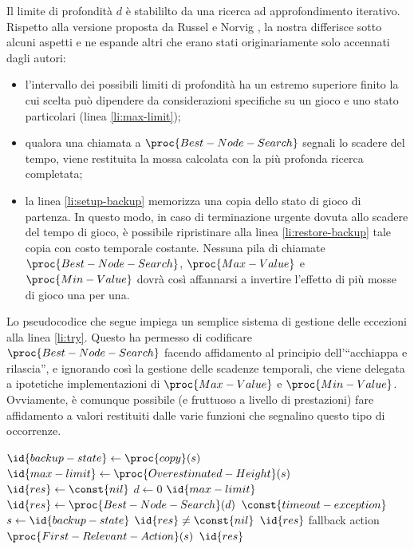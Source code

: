 \documentclass{article}
\begin{document}
Il limite di profondità $d$ è stabililto da una ricerca ad approfondimento
iterativo. Rispetto alla versione proposta da Russel e Norvig
\cite{at.UBO029034619980101.109--111}, la nostra differisce sotto alcuni aspetti
e ne espande altri che erano stati originariamente solo accennati dagli autori:
\begin{itemize}
    \item l'intervallo dei possibili limiti di profondità ha un estremo
      superiore finito la cui scelta può dipendere da considerazioni specifiche
      su un gioco e uno stato particolari (linea \ref{li:max-limit});
    \item qualora una chiamata a $\proc{Best-Node-Search}$ segnali lo scadere
      del tempo, viene restituita la mossa calcolata con la più profonda ricerca
      completata;
    \item la linea \ref{li:setup-backup} memorizza una copia dello stato di
      gioco di partenza. In questo modo, in caso di terminazione urgente dovuta
      allo scadere del tempo di gioco, è possibile ripristinare alla linea
      \ref{li:restore-backup} tale copia con costo temporale costante. Nessuna
      pila di chiamate $\proc{Best-Node-Search}$, $\proc{Max-Value}$ e
      $\proc{Min-Value}$ dovrà così affannarsi a invertire l'effetto di più
      mosse di gioco una per una.
\end{itemize}
\begin{sloppypar}
Lo pseudocodice che segue impiega un semplice sistema di gestione delle
eccezioni alla linea \ref{li:try}. Questo ha permesso di codificare
$\proc{Best-Node-Search}$ facendo affidamento al principio dell'``acchiappa e
rilascia'', e ignorando così la gestione delle scadenze temporali, che viene
delegata a ipotetiche implementazioni di $\proc{Max-Value}$ e
$\proc{Min-Value}$. Ovviamente, è comunque possibile (e fruttuoso a livello di
prestazioni) fare affidamento a valori restituiti dalle varie funzioni che
segnalino questo tipo di occorrenze.
\end{sloppypar}

\begin{codebox}
  \li  $\id{backup-state} \gets \proc{copy}(s)$ \label{li:setup-backup}
  \li  $\id{max-limit} \gets \proc{Overestimated-Height}(s)$
       \label{li:max-limit}
  \li  $\id{res} \gets \const{nil}$
  \li  \For $d \gets 0$ \To $\id{max-limit}$
  \li    \Do
            \label{li:try}
  \li        \Do
               $\id{res} \gets \proc{Best-Node-Search}(d)$
             \End
  \li      {} $\const{timeout-exception}$
  \li        \Do
               $s \gets \id{backup-state}$ \label{li:restore-backup}
  \li          \If $\id{res} \neq \const{nil}$
  \li            \Then
                   \Return $\id{res}$
                 \End
  \li          \Comment fallback action
  \li          \Return $\proc{First-Relevant-Action}(s)$
             \End
         \End
  \li  \Return $\id{res}$
\end{codebox}
\end{document}
